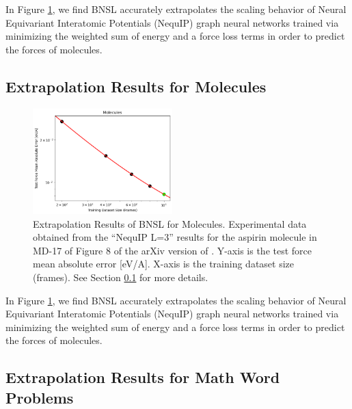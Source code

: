 \documentclass{article} %
\begin{document}
In Figure \ref{fig:molecules}, we find BNSL accurately extrapolates the scaling behavior of Neural Equivariant Interatomic Potentials (NequIP) graph neural networks \citep{Batzner_2022} trained via minimizing the weighted sum of energy and a force loss terms in order to predict the forces of molecules. 
\fi

\subsection{Extrapolation Results for Molecules}
\label{section:molecules}

\begin{figure}[htbp]
    \centering
\includegraphics[width=0.48\textwidth]{figures/molecules/molecules.png}
    \caption{
Extrapolation Results of BNSL for Molecules. Experimental data obtained from the ``NequIP L=3'' results for the aspirin molecule in MD-17 of Figure 8 of the arXiv version of \cite{Batzner_2022}. Y-axis is the test force mean absolute error [eV/A]. X-axis is the training dataset size (frames). See Section \ref{section:molecules} for more details.
    }
    \label{fig:molecules}
\end{figure}

In Figure \ref{fig:molecules}, we find BNSL accurately extrapolates the scaling behavior of Neural Equivariant Interatomic Potentials (NequIP) graph neural networks \citep{Batzner_2022} trained via minimizing the weighted sum of energy and a force loss terms in order to predict the forces of molecules. 


\clearpage

\subsection{Extrapolation Results for Math Word Problems}
\label{section:math_word_problems}
\end{document}
